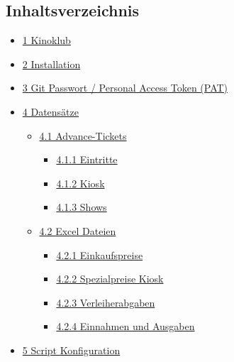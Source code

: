 \documentclass[
]{article}
\author{}
\date{\vspace{-2.5em}}
\providecommand{\tightlist}{%
  \setlength{\itemsep}{0pt}\setlength{\parskip}{0pt}}
\begin{document}
\subsection{Inhaltsverzeichnis}\label{inhaltsverzeichnis}

\begin{itemize}
\tightlist
\item
  \hyperref[A_1_Kinoklub]{1 Kinoklub}
\item
  \hyperref[A_2_Installation]{2 Installation}
\item
  \hyperref[A_3_Gitux5cux2520Passwortux5cux2520ux2fux5cux2520Personalux5cux2520Accessux5cux2520Tokenux5cux2520ux28PATux29]{3
  Git Passwort / Personal Access Token (PAT)}
\item
  \hyperref[A_4_Datensuxe4tze]{4 Datensätze}

  \begin{itemize}
  \tightlist
  \item
    \hyperref[A_4.1_Advance-Tickets]{4.1 Advance-Tickets}

    \begin{itemize}
    \tightlist
    \item
      \hyperref[A_4.1.1_Eintritte]{4.1.1 Eintritte}
    \item
      \hyperref[A_4.1.2_Kiosk]{4.1.2 Kiosk}
    \item
      \hyperref[A_4.1.3_Shows]{4.1.3 Shows}
    \end{itemize}
  \item
    \hyperref[A_4.2_Excelux5cux2520Dateien]{4.2 Excel Dateien}

    \begin{itemize}
    \tightlist
    \item
      \hyperref[A_4.2.1_Einkaufspreise]{4.2.1 Einkaufspreise}
    \item
      \hyperref[A_4.2.2_Spezialpreiseux5cux2520Kiosk]{4.2.2
      Spezialpreise Kiosk}
    \item
      \hyperref[A_4.2.3_Verleiherabgaben]{4.2.3 Verleiherabgaben}
    \item
      \hyperref[A_4.2.4_Einnahmenux5cux2520undux5cux2520Ausgaben]{4.2.4
      Einnahmen und Ausgaben}
    \end{itemize}
  \end{itemize}
\item
  \hyperref[A_5_Scriptux5cux2520Konfiguration]{5 Script Konfiguration}


\end{itemize}
\end{document}
